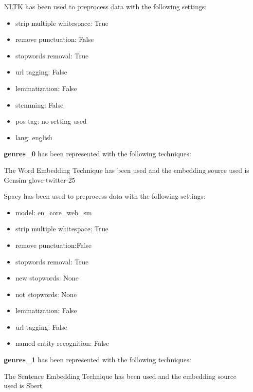 \documentclass[11pt]{article}
\begin{document}
NLTK has been used to preprocess data with the following settings:
\begin{itemize}
    \item strip multiple whitespace: True
    \item remove punctuation: False
    \item stopwords removal: True
    \item url tagging: False
    \item lemmatization: False
    \item stemming: False
    \item pos tag: no setting used
    \item lang: english
\end{itemize}
\hfill\break
\hfill\break



\textbf{genres_0} has been represented with the following techniques:
\hfill\break
\hfill\break



The Word Embedding Technique has been used and
the embedding source used is
Gensim glove-twitter-25
\hfill\break
\hfill\break



Spacy has been used to preprocess data with the following settings:
\begin{itemize}
    \item model: en\_core\_web\_sm
    \item strip multiple whitespace: True
    \item remove punctuation:False
    \item stopwords removal: True
    \item new stopwords: None
    \item not stopwords: None
    \item lemmatization: False
    \item url tagging: False
    \item named entity recognition: False
\end{itemize}
\hfill\break
\hfill\break



\textbf{genres_1} has been represented with the following techniques:
\hfill\break
\hfill\break



The Sentence Embedding Technique has been used and
the embedding source used is
Sbert
\hfill\break
\hfill\break
\end{document}
